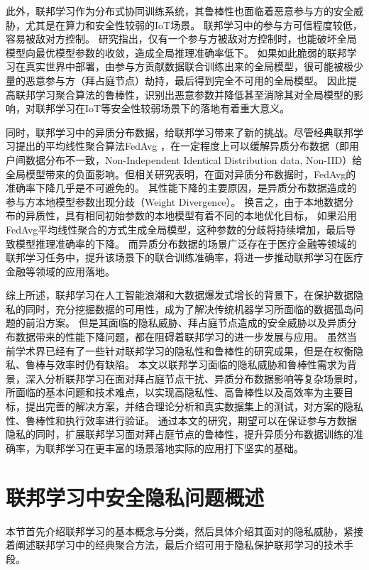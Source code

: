 此外，联邦学习作为分布式协同训练系统，其鲁棒性也面临着恶意参与方的安全威胁，尤其是在算力和安全性较弱的IoT场景。
联邦学习中的参与方可信程度较低，容易被敌对方控制。
研究\parencite{blanchard2017machine}指出，仅有一个参与方被敌对方控制时，也能破坏全局模型向最优模型参数的收敛，造成全局推理准确率低下。
如果如此脆弱的联邦学习在真实世界中部署，由参与方贡献数据联合训练出来的全局模型，很可能被极少量的恶意参与方（拜占庭节点）劫持，最后得到完全不可用的全局模型。
因此提高联邦学习聚合算法的鲁棒性，识别出恶意参数并降低甚至消除其对全局模型的影响，对联邦学习在IoT等安全性较弱场景下的落地有着重大意义。

同时，联邦学习中的异质分布数据，给联邦学习带来了新的挑战。尽管经典联邦学习提出的平均线性聚合算法FedAvg \cite{mcmahan2017communication}，在一定程度上可以缓解异质分布数据（即用户间数据分布不一致，Non-Independent Identical Distribution data, Non-IID）给全局模型带来的负面影响。但相关研究\parencite{zhao2018federated}表明，在面对异质分布数据时，FedAvg的准确率下降几乎是不可避免的。
其性能下降的主要原因，是异质分布数据造成的参与方本地模型参数出现分歧（Weight Divergence）。
换言之，由于本地数据分布的异质性，具有相同初始参数的本地模型有着不同的本地优化目标，
如果沿用FedAvg平均线性聚合的方式生成全局模型，这种参数的分歧将持续增加，最后导致模型推理准确率的下降。
而异质分布数据的场景广泛存在于医疗金融等领域的联邦学习任务中，提升该场景下的联合训练准确率，将进一步推动联邦学习在医疗金融等领域的应用落地。

综上所述，联邦学习在人工智能浪潮和大数据爆发式增长的背景下，在保护数据隐私的同时，充分挖掘数据的可用性，成为了解决传统机器学习所面临的数据孤岛问题的前沿方案。
但是其面临的隐私威胁、拜占庭节点造成的安全威胁以及异质分布数据带来的性能下降问题，都在阻碍着联邦学习的进一步发展与应用。
虽然当前学术界已经有了一些针对联邦学习的隐私性和鲁棒性的研究成果，但是在权衡隐私、鲁棒与效率时仍有缺陷。
本文以联邦学习面临的隐私威胁和鲁棒性需求为背景，深入分析联邦学习在面对拜占庭节点干扰、异质分布数据影响等复杂场景时，所面临的基本问题和技术难点，以实现高隐私性、高鲁棒性以及高效率为主要目标，提出完善的解决方案，并结合理论分析和真实数据集上的测试，对方案的隐私性、鲁棒性和执行效率进行验证。
通过本文的研究，期望可以在保证参与方数据隐私的同时，扩展联邦学习面对拜占庭节点的鲁棒性，提升异质分布数据训练的准确率，为联邦学习在更丰富的场景落地实际的应用打下坚实的基础。

\section{联邦学习中安全隐私问题概述}
本节首先介绍联邦学习的基本概念与分类，然后具体介绍其面对的隐私威胁，紧接着阐述联邦学习中的经典聚合方法，最后介绍可用于隐私保护联邦学习的技术手段。

